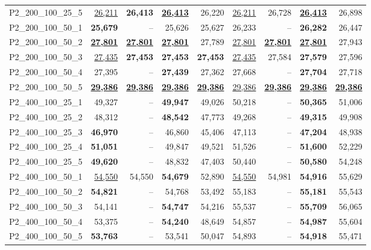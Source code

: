 \documentclass[smallextended]{svjour3}       %
\begin{document}
\begin{table}
\begin{tabular}{lrrrrrrrr}
P2\_200\_100\_25\_5 & \underline{26,211} & \textbf{26,413} & \underline{\textbf{26,413}} & 26,220 & \underline{26,211} & 26,728 & \underline{\textbf{26,413}} & 26,898 \\
P2\_200\_100\_50\_1 & \textbf{25,679} & -- & 25,626 & 25,627 & 26,233 & -- & \textbf{26,282} & 26,447 \\
P2\_200\_100\_50\_2 & \underline{\textbf{27,801}} & \underline{\textbf{27,801}} & \underline{\textbf{27,801}} & 27,789 & \underline{27,801} & \underline{\textbf{27,801}} & \underline{\textbf{27,801}} & 27,943 \\
P2\_200\_100\_50\_3 & \underline{27,435} & \textbf{27,453} & \textbf{27,453} & \textbf{27,453} & \underline{27,435} & 27,584 & \textbf{27,579} & 27,596 \\
P2\_200\_100\_50\_4 & 27,395 & -- & \textbf{27,439} & 27,362 & 27,668 & -- & \textbf{27,704} & 27,718 \\
P2\_200\_100\_50\_5 & \underline{\textbf{29,386}} & \underline{\textbf{29,386}} & \underline{\textbf{29,386}} & \underline{\textbf{29,386}} & \underline{29,386} & \underline{\textbf{29,386}} & \underline{\textbf{29,386}} & \underline{\textbf{29,386}} \\
P2\_400\_100\_25\_1 & 49,327 & -- & \textbf{49,947} & 49,026 & 50,218 & -- & \textbf{50,365} & 51,006 \\
P2\_400\_100\_25\_2 & 48,312 & -- & \textbf{48,542} & 47,773 & 49,268 & -- & \textbf{49,315} & 49,908 \\
P2\_400\_100\_25\_3 & \textbf{46,970} & -- & 46,860 & 45,406 & 47,113 & -- & \textbf{47,204} & 48,938 \\
P2\_400\_100\_25\_4 & \textbf{51,051} & -- & 49,847 & 49,521 & 51,526 & -- & \textbf{51,600} & 52,229 \\
P2\_400\_100\_25\_5 & \textbf{49,620} & -- & 48,832 & 47,403 & 50,440 & -- & \textbf{50,580} & 54,248 \\
P2\_400\_100\_50\_1 & \underline{54,550} & 54,550 & \textbf{54,679} & 52,890 & \underline{54,550} & 54,981 & \textbf{54,916} & 55,629 \\
P2\_400\_100\_50\_2 & \textbf{54,821} & -- & 54,768 & 53,492 & 55,183 & -- & \textbf{55,181} & 55,543 \\
P2\_400\_100\_50\_3 & 54,141 & -- & \textbf{54,747} & 54,216 & 55,537 & -- & \textbf{55,709} & 56,065 \\
P2\_400\_100\_50\_4 & 53,375 & -- & \textbf{54,240} & 48,649 & 54,857 & -- & \textbf{54,987} & 55,604 \\
P2\_400\_100\_50\_5 & \textbf{53,763} & -- & 53,541 & 50,047 & 54,893 & -- & \textbf{54,918} & 55,471 \\

\end{tabular}
\end{table}
\end{document}
